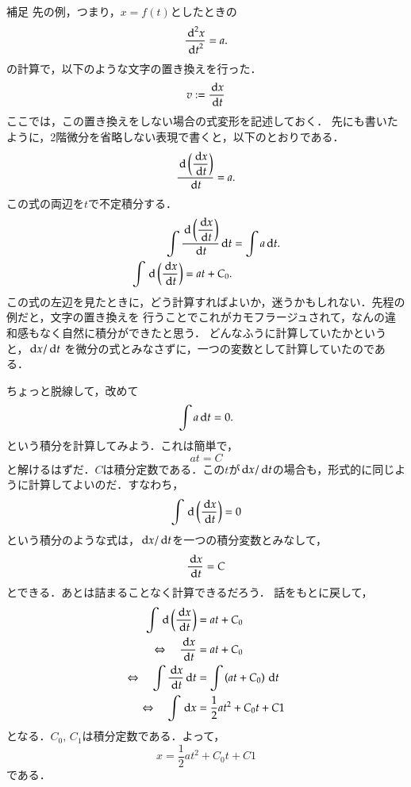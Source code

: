             \begin{memo}{補足}
                先の例，つまり，$x=f(t)$としたときの
                \[
                    \frac{{\,\mathrm{d}}^{2} x}{{\,\mathrm{d} t}^{2}} = a.
                \]
                の計算で，以下のような文字の置き換えを行った．
                \[
                    v := \frac{\,\mathrm{d} x}{\,\mathrm{d} t}
                \]
                ここでは，この置き換えをしない場合の式変形を記述しておく．
                先にも書いたように，2階微分を省略しない表現で書くと，以下のとおりである．
                \[
                    \frac{\,\mathrm{d} \displaystyle \left(\frac{\,\mathrm{d} x}{\,\mathrm{d} t}\right)}{\,\mathrm{d} t}= a.
                \]
                この式の両辺を$t$で不定積分する．
                \begin{align*}
                    \int \frac{\,\mathrm{d} \displaystyle \left(\frac{\,\mathrm{d} x}{\,\mathrm{d} t}\right)}{\,\mathrm{d} t} \,\mathrm{d} t &= \int a \,\mathrm{d} t. \\
                    \int \,\mathrm{d} \displaystyle \left (\frac{\,\mathrm{d} x}{\,\mathrm{d} t}\right) = at + {C}_{0}.
                \end{align*}
                この式の左辺を見たときに，どう計算すればよいか，迷うかもしれない．先程の例だと，文字の置き換えを
                行うことでこれがカモフラージュされて，なんの違和感もなく自然に積分ができたと思う．
                どんなふうに計算していたかというと，$\,\mathrm{d} x/\,\mathrm{d} t$ を微分の式とみなさずに，一つの変数として計算していたのである．

                ちょっと脱線して，改めて
                \[
                    \int a \,\mathrm{d} t = 0.    
                \]
                という積分を計算してみよう．これは簡単で，
                \[
                    at = C
                \]
                と解けるはずだ．$C$は積分定数である．この$t$が$\,\mathrm{d} x/\,\mathrm{d} t$の場合も，形式的に同じように計算してよいのだ．すなわち，
                \[
                    \int \,\mathrm{d} \displaystyle \left( \frac{\,\mathrm{d} x}{\,\mathrm{d} t} \right)= 0
                \]
                という積分のような式は，$\,\mathrm{d} x/\,\mathrm{d} t$を一つの積分変数とみなして，
                \[
                    \frac{\,\mathrm{d} x}{\,\mathrm{d} t} = C
                \]
                とできる．あとは詰まることなく計算できるだろう．
                話をもとに戻して，
                \begin{align*}
                    \int \,\mathrm{d} \displaystyle \left (\frac{\,\mathrm{d} x}{\,\mathrm{d} t}\right) &= at + {C}_{0} \\
                    \Leftrightarrow \quad \frac{\,\mathrm{d} x}{\,\mathrm{d} t} &= at + {C}_{0} \\
                    \Leftrightarrow \quad \int \frac{\,\mathrm{d} x}{\,\mathrm{d} t} \,\mathrm{d} t &=  \int \left(at + {C}_{0} \right)\,\mathrm{d} t\\
                    \Leftrightarrow \quad \int \,\mathrm{d} x &= \frac{1}{2}a{t}^{2} + {C}_{0}t + C{1} \\
                \end{align*}
                となる．${C}_{0},\,{C}_{1}$は積分定数である．よって，
                \[
                    x = \frac{1}{2}a{t}^{2} + {C}_{0}t + C{1}
                \]
                である．
 



            \end{memo}


